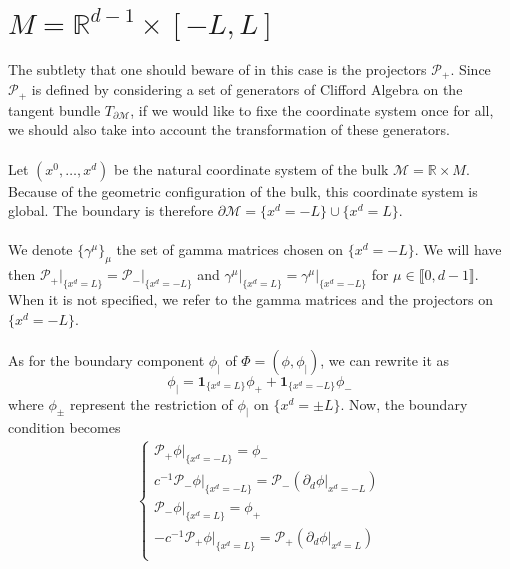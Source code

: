 \section{${M} = \mathbb{R}^{d-1} \times [-L, L]$ }\label{wen-subsect-saw2}
The subtlety that one should beware of in this case is the projectors $\mathcal{P}_+$.
Since $\mathcal{P}_+$ is defined by considering a set of generators of Clifford Algebra on the tangent bundle $T_{ \partial \mathcal{M}}$, 
if we would like to fixe the coordinate system once for all,
we should also take into account the transformation of these generators. \\\\
Let $(x^0, \ldots, x^d)$ be the natural coordinate system of the bulk $\mathcal{M} =\mathbb{R}\times M $. 
Because of the geometric configuration of the bulk, 
this coordinate system is global. 
The boundary is therefore $\partial \mathcal{M} = \{x^d = -L \} \cup \{ x^d = L \}$.
\\\\
We denote $\{\gamma^\mu\}_\mu$ the set of gamma matrices chosen on $\{x^d  = - L \}$. 
We will have then $\mathcal{P}_+\vert_{\{x^d = L\}} = \mathcal{P}_-\vert_{\{x^d = -L\}}$ and $\gamma^\mu\vert_{\{x^d = L\}}=\gamma^\mu\vert_{\{x^d = -L\}}$ for $\mu\in\llbracket 0, d-1 \rrbracket$.
When it is not specified, we refer to the gamma matrices and the projectors on $\{x^d = -L\}$. \\\\
%
As for the boundary component $\phi_|$ of $\Phi= (\phi, \phi_|)$,
we can rewrite it as
\begin{equation*}
\phi_| = \mathbf{1}_{\{x^d = L \}}\phi_+ + \mathbf{1}_{\{x^d = - L \}}\phi_-
\end{equation*}
where $\phi_\pm$ represent the restriction of $\phi_|$ on $\{x^d = \pm L \}$.
Now, the boundary condition becomes
\begin{equation}\label{wen-saw2bound}
\begin{split}
\begin{cases}
\mathcal{P}_+ \phi\vert_{\{x^d = -L\}} = \phi_- \\
c^{-1}\mathcal{P}_-\phi\vert_{\{x^d = -L\}} = \mathcal{P}_-(\partial_d \phi\vert_{x^d = -L}) \\
\mathcal{P}_- \phi\vert_{\{x^d = L\}} =\phi_+ \\
-c^{-1}\mathcal{P}_+\phi\vert_{\{x^d = L\}} = \mathcal{P}_+(\partial_d \phi\vert_{x^d = L}) \\
\end{cases}
\end{split}
\end{equation}
